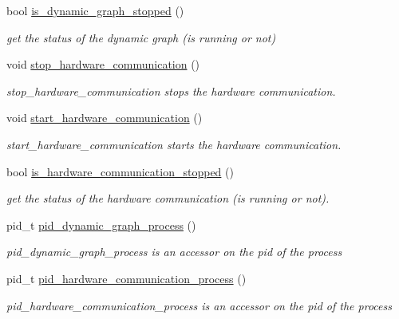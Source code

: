 \begin{DoxyCompactItemize}
bool \hyperlink{classdynamic__graph_1_1DynamicGraphManager_ab929d21277e5d2fba726b8ae422c27a8}{is\+\_\+dynamic\+\_\+graph\+\_\+stopped} ()
\begin{DoxyCompactList}\small\item\em get the status of the dynamic graph (is running or not) \end{DoxyCompactList}\item 
void \hyperlink{classdynamic__graph_1_1DynamicGraphManager_aabf11778fb69e5203d38c8093de60bab}{stop\+\_\+hardware\+\_\+communication} ()
\begin{DoxyCompactList}\small\item\em stop\+\_\+hardware\+\_\+communication stops the hardware communication. \end{DoxyCompactList}\item 
void \hyperlink{classdynamic__graph_1_1DynamicGraphManager_a234bef10fea6e3f9beb1580491127660}{start\+\_\+hardware\+\_\+communication} ()
\begin{DoxyCompactList}\small\item\em start\+\_\+hardware\+\_\+communication starts the hardware communication. \end{DoxyCompactList}\item 
bool \hyperlink{classdynamic__graph_1_1DynamicGraphManager_afcc53ebec6e5f2057c23a05894715125}{is\+\_\+hardware\+\_\+communication\+\_\+stopped} ()
\begin{DoxyCompactList}\small\item\em get the status of the hardware communication (is running or not). \end{DoxyCompactList}\item 
pid\+\_\+t \hyperlink{classdynamic__graph_1_1DynamicGraphManager_a9c11927e0b76e91fabc4b34ea7fb85bc}{pid\+\_\+dynamic\+\_\+graph\+\_\+process} ()
\begin{DoxyCompactList}\small\item\em pid\+\_\+dynamic\+\_\+graph\+\_\+process is an accessor on the pid of the process \end{DoxyCompactList}\item 
pid\+\_\+t \hyperlink{classdynamic__graph_1_1DynamicGraphManager_ac1abb11591e037e203329e900c89f4f5}{pid\+\_\+hardware\+\_\+communication\+\_\+process} ()
\begin{DoxyCompactList}\small\item\em pid\+\_\+hardware\+\_\+communication\+\_\+process is an accessor on the pid of the process \end{DoxyCompactList}\item 

\end{DoxyCompactItemize}
